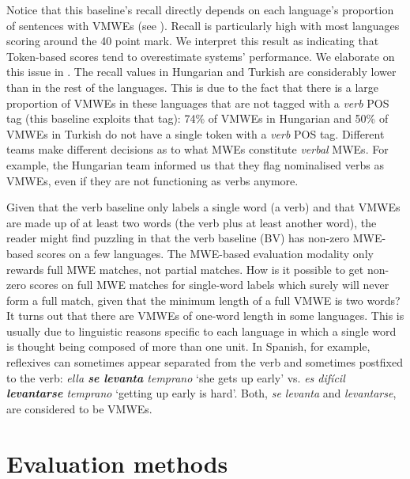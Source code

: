 \documentclass[output=paper
,modfonts
,nonflat,draftmode]{langsci/langscibook}
\begin{document}
Notice that this baseline's recall directly depends on each language's proportion of sentences with VMWEs (see ). Recall is particularly high with most languages scoring around the 40 point mark. We interpret this result as indicating that Token-based scores tend to overestimate systems' performance. We elaborate on this issue in . The recall values in Hungarian and Turkish are considerably lower than in the rest of the languages. This is due to the fact that there is a large proportion of VMWEs in these languages that are not tagged with a \emph{verb} POS tag (this baseline exploits that tag): 74\% of VMWEs in Hungarian and 50\% of VMWEs in Turkish do not have a single token with a \emph{verb} POS tag. Different teams make different decisions as to what MWEs constitute \emph{verbal} MWEs. For example, the Hungarian team informed us that they flag nominalised verbs as VMWEs, even if they are not functioning as verbs anymore.

Given that the verb baseline only labels a single word (a verb) and that VMWEs are made up of at least two words (the verb plus at least another word), the reader might find puzzling in  that the verb baseline (BV) has non-zero MWE-based scores on a few languages. The MWE-based evaluation modality only rewards full MWE matches, not partial matches. How is it possible to get non-zero scores on full MWE matches for single-word labels which surely will never form a full match, given that the minimum length of a full VMWE is two words? It turns out that there are VMWEs of one-word length in some languages. This is usually due to linguistic reasons specific to each language in which a single word is thought being composed of more than one unit. In Spanish, for example, reflexives can sometimes appear separated from the verb and sometimes postfixed to the verb: \emph{ella \textbf{se \mbox{levanta}} \mbox{temprano}} `she gets up early' vs. \emph{es \mbox{difícil} \textbf{\mbox{levantarse}} \mbox{temprano}} `getting up early is hard'. Both, \emph{se levanta} and \emph{levantarse}, are considered to be VMWEs. 



\section{\label{sec:eval-methods}Evaluation methods}
\end{document}
